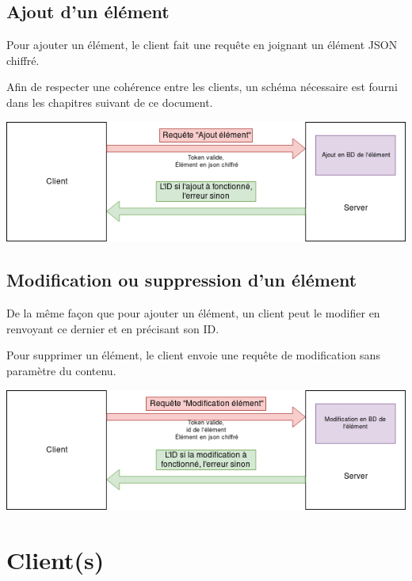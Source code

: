 \documentclass[oneside]{report}
\begin{document}
	\section{Ajout d'un élément}{
		\par Pour ajouter un élément, le client fait une requête en joignant un élément JSON chiffré.
		\par Afin de respecter une cohérence entre les clients, un schéma nécessaire est fourni dans les chapitres suivant de ce document.
		\begin{center}
			\includegraphics[scale=.5]{reseau_add_elt}
		\end{center}

	}

	\section{Modification ou suppression d'un élément}{
		\par De la même façon que pour ajouter un élément, un client peut le modifier en renvoyant ce dernier et en précisant son ID.
		\par Pour supprimer un élément, le client envoie une requête de modification sans paramètre du contenu.
		\begin{center}
			\includegraphics[scale=.5]{reseau_update_elt}
		\end{center}
	}

	\chapter{Client(s)}
\end{document}
